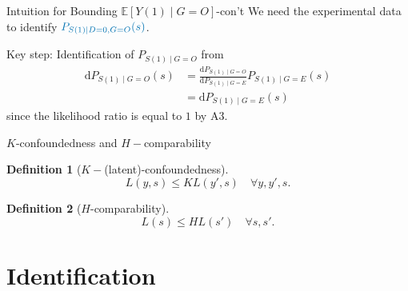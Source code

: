 \documentclass{beamer}					%
\newtheorem{defn}{Definition}
\newcommand{\Ep}{\mathbb{E}}
\begin{document}
\begin{frame}{Intuition for Bounding $\Ep[Y(1) \mid G = O]$-con't}
    We need the experimental data to identify ${\color{blue}P_{S(1) \mid D = 0, G = O}(s)}$. 
     

    Key step: Identification of $P_{S(1) \mid G = O}$ from \begin{align*}
        \mathrm{d} P_{S(1) \mid G = O}(s) & = \frac{\mathrm{d} P_{S(1) \mid G = O} }{\mathrm{d} P_{S(1) \mid G = E}} P_{S(1) \mid G = E}(s) \\
        & = \mathrm{d} P_{S(1) \mid G = E}(s)
    \end{align*} since the likelihood ratio is equal to $1$ by A3.
\end{frame}

\begin{frame}{$K$-confoundedness  and $H-$comparability}
    \begin{defn}[$K-$(latent)-confoundedness]  $$L(y,s) \leq K L(y',s) \quad \forall y,y',s.$$
	\end{defn}

	\begin{defn}[$H$-comparability]
	  $$L(s) \leq H L(s') \quad \forall s,s'.$$
	\end{defn}
\end{frame}

\section{Identification}
\end{document}
